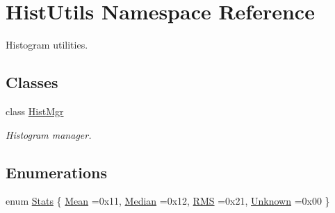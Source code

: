 \hypertarget{namespaceHistUtils}{}\section{Hist\+Utils Namespace Reference}
\label{namespaceHistUtils}


Histogram utilities.  


\subsection*{Classes}
\begin{DoxyCompactItemize}
\item 
class \hyperlink{classHistUtils_1_1HistMgr}{Hist\+Mgr}
\begin{DoxyCompactList}\small\item\em Histogram manager. \end{DoxyCompactList}\end{DoxyCompactItemize}
\subsection*{Enumerations}
\begin{DoxyCompactItemize}
\item 
enum \hyperlink{namespaceHistUtils_aee957b08165ec79d9ab22d3985938110}{Stats} \{ \hyperlink{namespaceHistUtils_aee957b08165ec79d9ab22d3985938110ae57ec394e887bc7762c6476186d7eaf8}{Mean} =0x11, 
\hyperlink{namespaceHistUtils_aee957b08165ec79d9ab22d3985938110abf140a74893a9708698f76a4ee416789}{Median} =0x12, 
\hyperlink{namespaceHistUtils_aee957b08165ec79d9ab22d3985938110a1058d6eb74658ec382948203fe444f2e}{R\+MS} =0x21, 
\hyperlink{namespaceHistUtils_aee957b08165ec79d9ab22d3985938110ae0759b6d55043d68f3704e920af7c8a1}{Unknown} =0x00
 \}
\end{DoxyCompactItemize}
